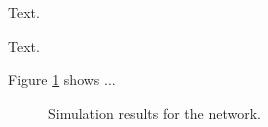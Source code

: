 \documentclass[conference]{IEEEtran}
\begin{document}
Text.

Text.

Figure \ref{fig_sim} shows ...

%
%
\begin{figure}[!tp]
\centering
\caption{Simulation results for the network.}
\label{fig_sim}
\end{figure}



%
%
\end{document}
